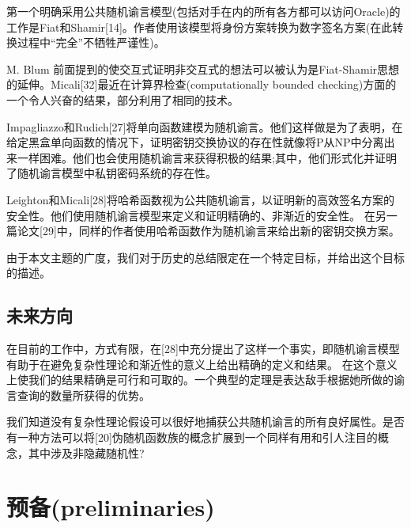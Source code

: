 \documentclass[]{article}
\begin{document}
    
    第一个明确采用公共随机谕言模型(包括对手在内的所有各方都可以访问Oracle)的工作是Fiat和Shamir[14]。作者使用该模型将身份方案转换为数字签名方案(在此转换过程中“完全”不牺牲严谨性)。
    
    
    M. Blum 前面提到的使交互式证明非交互式的想法可以被认为是Fiat-Shamir思想的延伸。Micali[32]最近在计算界检查(computationally bounded checking)方面的一个令人兴奋的结果，部分利用了相同的技术。
    
    
    Impagliazzo和Rudich[27]将单向函数建模为随机谕言。他们这样做是为了表明，在给定黑盒单向函数的情况下，证明密钥交换协议的存在性就像将P从NP中分离出来一样困难。他们也会使用随机谕言来获得积极的结果;其中，他们形式化并证明了随机谕言模型中私钥密码系统的存在性。
    
    
    Leighton和Micali[28]将哈希函数视为公共随机谕言，以证明新的高效签名方案的安全性。他们使用随机谕言模型来定义和证明精确的、非渐近的安全性。
    在另一篇论文[29]中，同样的作者使用哈希函数作为随机谕言来给出新的密钥交换方案。
    
    
    由于本文主题的广度，我们对于历史的总结限定在一个特定目标，并给出这个目标的描述。
    
    \subsection{未来方向}
    
    在目前的工作中，方式有限，在[28]中充分提出了这样一个事实，即随机谕言模型有助于在避免复杂性理论和渐近性的意义上给出精确的定义和结果。
    在这个意义上使我们的结果精确是可行和可取的。一个典型的定理是表达敌手根据她所做的谕言查询的数量所获得的优势。
    
    
    我们知道没有复杂性理论假设可以很好地捕获公共随机谕言的所有良好属性。是否有一种方法可以将[20]伪随机函数族的概念扩展到一个同样有用和引人注目的概念，其中涉及非隐藏随机性?
    
    
    \section{预备(preliminaries)}
    
\end{document}
